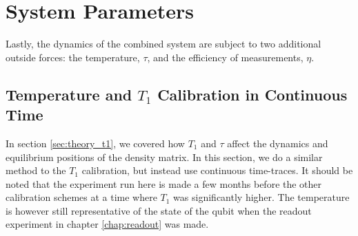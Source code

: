 
\section{System Parameters}
Lastly, the dynamics of the combined system are subject to two additional outside forces: the temperature, $\tau$, and the efficiency of measurements, $\eta$.


\subsection{Temperature and $T_1$ Calibration in Continuous Time}\label{sec:continuous_calibratino}
In section \ref{sec:theory_t1}, we covered how $T_1$ and $\tau$ affect the dynamics and equilibrium positions of the density matrix. In this section, we do a similar method to the $T_1$ calibration, but instead use continuous time-traces. It should be noted that the experiment run here is made a few months before the other calibration schemes at a time where $T_1$ was significantly higher. The temperature is however still representative of the state of the qubit when the readout experiment in chapter \ref{chap:readout} was made.



